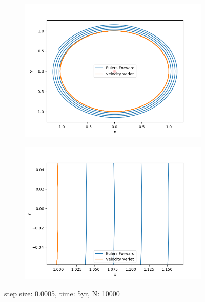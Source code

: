 \documentclass{article}
\begin{document}
\begin{figure}[H]
  \centering
  \begin{subfigure}{0.5\textwidth}
    \centering
    \includegraphics[width=1.0\textwidth]{plots/compare_h0005.png}
  \end{subfigure}%
  \begin{subfigure}{0.5\textwidth}
    \centering
    \includegraphics[width=1.0\textwidth]{plots/compare_h0005_zoom.png}
  \end{subfigure}
  \caption{step size: 0.0005, time: 5yr, N: 10000}
\end{figure}
\end{document}
